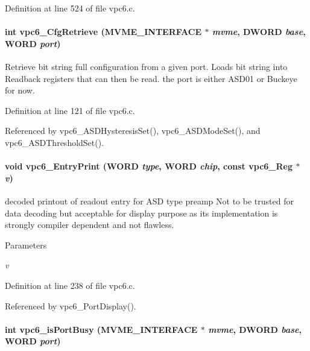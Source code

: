 Definition at line 524 of file vpc6.c.
\paragraph[{vpc6\_\-CfgRetrieve}]{\setlength{\rightskip}{0pt plus 5cm}int vpc6\_\-CfgRetrieve ({\bf MVME\_\-INTERFACE} $\ast$ {\em mvme}, \/  {\bf DWORD} {\em base}, \/  {\bf WORD} {\em port})}\hfill\label{vpc6_8c_a7def69c129b90426d2c5834b18d1b81f}
Retrieve bit string full configuration from a given port. Loads bit string into Readback registers that can then be read. the port is either ASD01 or Buckeye for now. 

Definition at line 121 of file vpc6.c.

Referenced by vpc6\_\-ASDHysteresisSet(), vpc6\_\-ASDModeSet(), and vpc6\_\-ASDThresholdSet().
\paragraph[{vpc6\_\-EntryPrint}]{\setlength{\rightskip}{0pt plus 5cm}void vpc6\_\-EntryPrint ({\bf WORD} {\em type}, \/  {\bf WORD} {\em chip}, \/  const {\bf vpc6\_\-Reg} $\ast$ {\em v})}\hfill\label{vpc6_8c_acba11652b38f9148081dc825bb79ccd5}
decoded printout of readout entry for ASD type preamp Not to be trusted for data decoding but acceptable for display purpose as its implementation is strongly compiler dependent and not flawless. 
\begin{DoxyParams}{Parameters}
\item[{\em v}]\end{DoxyParams}


Definition at line 238 of file vpc6.c.

Referenced by vpc6\_\-PortDisplay().
\paragraph[{vpc6\_\-isPortBusy}]{\setlength{\rightskip}{0pt plus 5cm}int vpc6\_\-isPortBusy ({\bf MVME\_\-INTERFACE} $\ast$ {\em mvme}, \/  {\bf DWORD} {\em base}, \/  {\bf WORD} {\em port})}\hfill\label{vpc6_8c_a3b49ac5c590e4a1da458708bd791ec76}



